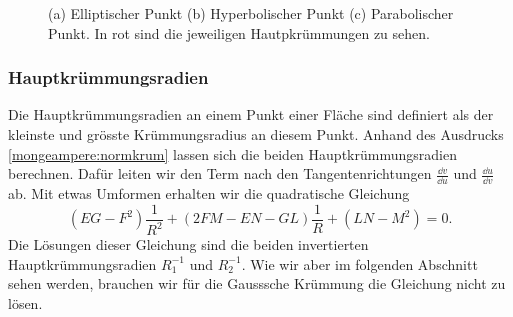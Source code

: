 \begin{figure}
	\centering
	\caption{(a) Elliptischer Punkt (b) Hyperbolischer Punkt  (c) Parabolischer Punkt. In rot sind die jeweiligen Hautpkrümmungen zu sehen.}
	\label{mongeampere:arten}\end{figure}
\subsubsection{Hauptkrümmungsradien}
Die Hauptkrümmungsradien an einem Punkt einer Fläche sind definiert als der kleinste und grösste Krümmungsradius an diesem Punkt.
Anhand des Ausdrucks \eqref{mongeampere:normkrum} lassen sich die beiden Hauptkrümmungsradien berechnen.
Dafür leiten wir den Term nach den Tangentenrichtungen $\frac{\dd v}{\dd u}$ und $\frac{\dd u}{\dd v}$ ab.
Mit etwas Umformen erhalten wir die quadratische Gleichung
\begin{equation}
  (EG - F^2)\frac{1}{R^2} + (2FM - EN - GL)\frac{1}{R} + (LN-M^2) = 0.
  \label{mongeampere:mainkrum}
\end{equation}
Die Lösungen dieser Gleichung sind die beiden invertierten Hauptkrümmungsradien $R_1^{-1}$ und $R_2^{-1}$.
Wie wir aber im folgenden Abschnitt sehen werden, brauchen wir für die Gausssche Krümmung die Gleichung nicht 
zu lösen.


